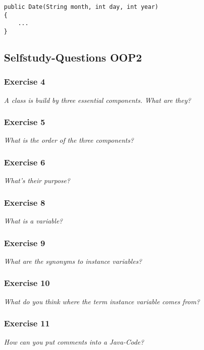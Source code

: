\begin{lstlisting}
public Date(String month, int day, int year)
{
	...
}
\end{lstlisting}

\newpage
\subsection{Selfstudy-Questions OOP2}
\subsubsection*{Exercise 4}
\textit{A class is build by three essential components. What are they?}\\

\subsubsection*{Exercise 5}
\textit{What is the order of the three components?}\\

\subsubsection*{Exercise 6}
\textit{What's their purpose?}\\

\subsubsection*{Exercise 8}
\textit{What is a variable?}\\

\subsubsection*{Exercise 9}
\textit{What are the synonyms to instance variables?}\\

\subsubsection*{Exercise 10}
\textit{What do you think where the term instance variable comes from?}\\

\subsubsection*{Exercise 11}
\textit{How can you put comments into a Java-Code?}\\

